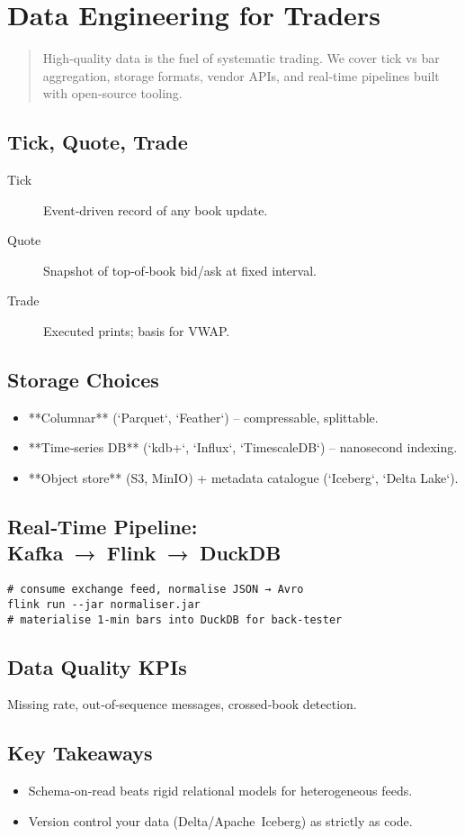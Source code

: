 \chapter{Data Engineering for Traders}\label{ch:dataeng}

\begin{abstract}
High‑quality data is the fuel of systematic trading.  We cover tick vs
bar aggregation, storage formats, vendor APIs, and real‑time pipelines
built with open‑source tooling.
\end{abstract}

\section{Tick, Quote, Trade}

\begin{description}
  \item[Tick] Event‑driven record of any book update.
  \item[Quote] Snapshot of top‑of‑book bid/ask at fixed interval.
  \item[Trade] Executed prints; basis for VWAP.
\end{description}

\section{Storage Choices}

\begin{itemize}
  \item **Columnar** (`Parquet`, `Feather`) – compressable, splittable.
  \item **Time‑series DB** (`kdb+`, `Influx`, `TimescaleDB`) – nanosecond indexing.
  \item **Object store** (S3, MinIO) + metadata catalogue (`Iceberg`, `Delta Lake`).
\end{itemize}

\section{Real‑Time Pipeline: Kafka → Flink → DuckDB}

\begin{verbatim}
# consume exchange feed, normalise JSON → Avro
flink run --jar normaliser.jar
# materialise 1‑min bars into DuckDB for back‑tester
\end{verbatim}

\section{Data Quality KPIs}

Missing rate, out‑of‑sequence messages, crossed‑book detection.

\section*{Key Takeaways}
\begin{itemize}
  \item Schema‑on‑read beats rigid relational models for heterogeneous feeds.
  \item Version control your data (Delta/Apache Iceberg) as strictly as code.
\end{itemize}
